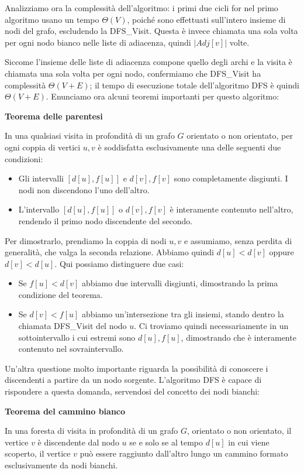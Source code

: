 \noindent Analizziamo ora la complessità dell'algoritmo: i primi due cicli for nel primo algoritmo usano un tempo $\Theta(V)$, poiché sono effettuati sull'intero insieme di nodi del grafo, escludendo la DFS\_Visit. Questa è invece chiamata una sola volta per ogni nodo bianco nelle liste di adiacenza, quindi $|Adj[v]|$ volte.\par
Siccome l'insieme delle liste di adiacenza compone quello degli archi e la visita è chiamata una sola volta per ogni nodo, confermiamo che DFS\_Visit ha complessità $\Theta(V+E)$; il tempo di esecuzione totale dell'algoritmo DFS è quindi $\Theta(V+E)$. Enunciamo ora alcuni teoremi importanti per questo algoritmo: \begin{teorema}
	\textbf{Teorema delle parentesi}\par
	\noindent In una qualsiasi visita in profondità di un grafo $G$ orientato o non orientato, per ogni coppia di vertici $u,v$ è soddisfatta esclusivamente una delle seguenti due condizioni: \begin{itemize}
		\item Gli intervalli $[d[u], f[u]]$ e $d[v], f[v]$ sono completamente disgiunti. I nodi non discendono l'uno dell'altro.
		\item L'intervallo $[d[u], f[u]]$ o $d[v], f[v]$ è interamente contenuto nell'altro, rendendo il primo nodo discendente del secondo.
	\end{itemize}
\end{teorema}
\noindent Per dimostrarlo, prendiamo la coppia di nodi $u,v$ e assumiamo, senza perdita di generalità, che valga la seconda relazione. Abbiamo quindi $d[u] < d[v]$ oppure $d[v] < d[u]$. Qui possiamo distinguere due casi: \begin{itemize}
	\item Se $f[u] < d[v]$ abbiamo due intervalli disgiunti, dimostrando la prima condizione del teorema.
	\item Se $d[v] < f[u]$ abbiamo un'intersezione tra gli insiemi, stando dentro la chiamata DFS\_Visit del nodo $u$. Ci troviamo quindi necessariamente in un sottointervallo i cui estremi sono $d[u], f[u]$, dimostrando che è interamente contenuto nel sovraintervallo.
\end{itemize}
\noindent Un'altra questione molto importante riguarda la possibilità di conoscere i discendenti a partire da un nodo sorgente. L'algoritmo DFS è capace di rispondere a questa domanda, servendosi del concetto dei nodi bianchi: \begin{teorema}
	\textbf{Teorema del cammino bianco}\par
	\noindent In una foresta di visita in profondità di un grafo $G$, orientato o non orientato, il vertice $v$ è discendente dal nodo $u$ se e solo se al tempo $d[u]$ in cui viene scoperto, il vertice $v$ può essere raggiunto dall'altro lungo un cammino formato esclusivamente da nodi bianchi.
\end{teorema}
